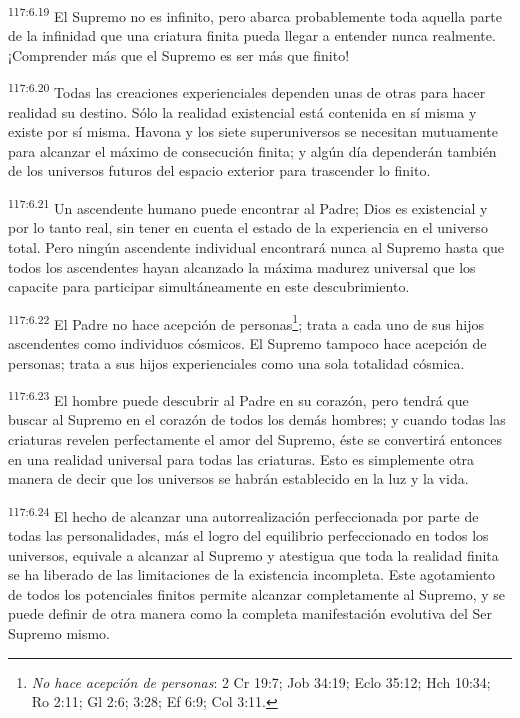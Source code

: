 \documentclass[twoside, 11pt]{book}
\begin{document}
\par
\textsuperscript{117:6.19} El Supremo no es infinito, pero abarca probablemente toda aquella parte de la infinidad que una criatura finita pueda llegar a entender nunca realmente. ¡Comprender más que el Supremo es ser más que finito!

\par
\textsuperscript{117:6.20} Todas las creaciones experienciales dependen unas de otras para hacer realidad su destino. Sólo la realidad existencial está contenida en sí misma y existe por sí misma. Havona y los siete superuniversos se necesitan mutuamente para alcanzar el máximo de consecución finita; y algún día dependerán también de los universos futuros del espacio exterior para trascender lo finito.

\par
\textsuperscript{117:6.21} Un ascendente humano puede encontrar al Padre; Dios es existencial y por lo tanto real, sin tener en cuenta el estado de la experiencia en el universo total. Pero ningún ascendente individual encontrará nunca al Supremo hasta que todos los ascendentes hayan alcanzado la máxima madurez universal que los capacite para participar simultáneamente en este descubrimiento.

\par
\textsuperscript{117:6.22} El Padre no hace acepción de personas\footnote{\textit{No hace acepción de personas}: 2 Cr 19:7; Job 34:19; Eclo 35:12; Hch 10:34; Ro 2:11; Gl 2:6; 3:28; Ef 6:9; Col 3:11.}; trata a cada uno de sus hijos ascendentes como individuos cósmicos. El Supremo tampoco hace acepción de personas; trata a sus hijos experienciales como una sola totalidad cósmica.

\par
\textsuperscript{117:6.23} El hombre puede descubrir al Padre en su corazón, pero tendrá que buscar al Supremo en el corazón de todos los demás hombres; y cuando todas las criaturas revelen perfectamente el amor del Supremo, éste se convertirá entonces en una realidad universal para todas las criaturas. Esto es simplemente otra manera de decir que los universos se habrán establecido en la luz y la vida.

\par
\textsuperscript{117:6.24} El hecho de alcanzar una autorrealización perfeccionada por parte de todas las personalidades, más el logro del equilibrio perfeccionado en todos los universos, equivale a alcanzar al Supremo y atestigua que toda la realidad finita se ha liberado de las limitaciones de la existencia incompleta. Este agotamiento de todos los potenciales finitos permite alcanzar completamente al Supremo, y se puede definir de otra manera como la completa manifestación evolutiva del Ser Supremo mismo.
\end{document}
